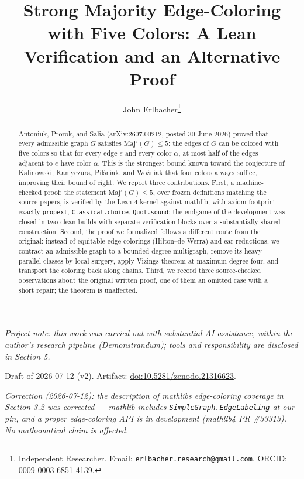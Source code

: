 \documentclass[11pt]{article}
\title{Strong Majority Edge-Coloring with Five Colors: A Lean Verification and an Alternative Proof}
\author{John Erlbacher\thanks{Independent Researcher. Email: \texttt{erlbacher.research@gmail.com}. ORCID: 0009-0003-6851-4139.}}
\date{}
\theoremstyle{definition}
\theoremstyle{remark}
\begin{document}
\maketitle

\begin{center}
\emph{Project note: this work was carried out with substantial AI assistance, within the author's research pipeline (Demonstrandum); tools and responsibility are disclosed in Section 5.}

\medskip
Draft of 2026-07-12 (v2). Artifact: \href{https://doi.org/10.5281/zenodo.21316623}{doi:10.5281/zenodo.21316623}.

\medskip
\noindent\textit{Correction (2026-07-12): the description of mathlib\textquotesingle s edge-coloring coverage in Section 3.2 was corrected --- mathlib includes \texttt{SimpleGraph.EdgeLabeling} at our pin, and a proper edge-coloring API is in development (mathlib4 PR \#33313). No mathematical claim is affected.}
\end{center}

\begin{abstract}
Antoniuk, Prorok, and Salia (arXiv:2607.00212, posted 30 June 2026) proved that every admissible graph \(G\) satisfies \(\mathrm{Maj}'(G) \le 5\): the edges of \(G\) can be colored with five colors so that for every edge \(e\) and every color \(\alpha\), at most half of the edges adjacent to \(e\) have color \(\alpha\). This is the strongest bound known toward the conjecture of Kalinowski, Kamyczura, Pilśniak, and Woźniak that four colors always suffice, improving their bound of eight. We report three contributions. First, a machine-checked proof: the statement \(\mathrm{Maj}'(G) \le 5\), over frozen definitions matching the source papers, is verified by the Lean 4 kernel against mathlib, with axiom footprint exactly \texttt{propext}, \texttt{Classical.choice}, \texttt{Quot.sound}; the endgame of the development was closed in two clean builds with separate verification blocks over a substantially shared construction. Second, the proof we formalized follows a different route from the original: instead of equitable edge-colorings (Hilton--de Werra) and ear reductions, we contract an admissible graph to a bounded-degree multigraph, remove its heavy parallel classes by local surgery, apply Vizing\textquotesingle s theorem at maximum degree four, and transport the coloring back along chains. Third, we record three source-checked observations about the original written proof, one of them an omitted case with a short repair; the theorem is unaffected.
\end{abstract}
\end{document}
